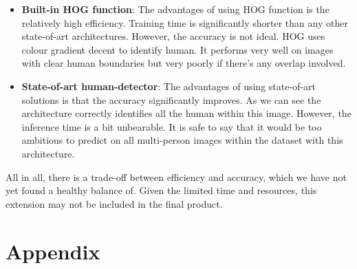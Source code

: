 \documentclass[11pt, letterpaper]{article}
\begin{document}
\begin{itemize}
    \item \textbf{Built-in HOG function}: 
    The advantages of using HOG function is the relatively high efficiency. Training time is significantly shorter than any other state-of-art architectures. However, the accuracy is not ideal. HOG uses colour gradient decent to identify human. It performs very well on images with clear human boundaries but very poorly if there’s any overlap involved.  
    \item \textbf{State-of-art human-detector}: 
    The advantages of using state-of-art solutions is that the accuracy significantly improves. As we can see the architecture correctly identifies all the human within this image. However, the inference time is a bit unbearable. It is safe to say that it would be too ambitious to predict on all multi-person images within the dataset with this architecture. 
\end{itemize}

All in all, there is a trade-off between efficiency and accuracy, which we have not yet found a healthy balance of. Given the limited time and resources, this extension may not be included in the final product.











\clearpage




\clearpage
\section{Appendix}
 
\end{document}
